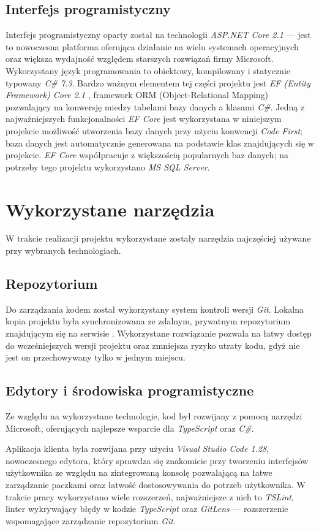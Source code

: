 \documentclass[eng,printmode,openany]{mgr}
\begin{document}
	\subsection{Interfejs programistyczny}
	Interfejs programistyczny oparty został na technologii \textit{ASP.NET Core 2.1} — jest to nowoczesna platforma oferująca działanie na wielu systemach operacyjnych oraz większa wydajność względem starszych rozwiązań firmy Microsoft. Wykorzystany język programowania to obiektowy, kompilowany i statycznie typowany \textit{C\# 7.3}. Bardzo ważnym elementem tej części projektu jest \textit{EF (Entity Framework) Core 2.1} \cite{msdn-efcore}, framework ORM (Object-Relational Mapping) pozwalający na konwersję miedzy tabelami bazy danych a klasami \textit{C\#}. Jedną z najważniejszych funkcjonalności \textit{EF Core} jest wykorzystana w niniejszym projekcie możliwość utworzenia bazy danych przy użyciu konwencji \textit{Code First}; baza danych jest automatycznie generowana na podstawie klas  znajdujących się w projekcie. \textit{EF Core} współpracuje z większością popularnych baz danych; na potrzeby tego projektu wykorzystano \textit{MS SQL Server}.
	
	\section{Wykorzystane narzędzia}
	W trakcie realizacji projektu wykorzystane zostały narzędzia najczęściej używane przy wybranych technologiach.
	\subsection{Repozytorium}
	Do zarządzania kodem został wykorzystany system kontroli wersji \textit{Git}. Lokalna kopia projektu była synchronizowana ze zdalnym, prywatnym repozytorium znajdującym się na serwisie . Wykorzystane rozwiązanie pozwala na łatwy dostęp do wcześniejszych wersji projektu oraz zmniejsza ryzyko utraty kodu, gdyż nie jest on przechowywany tylko w jednym miejscu.
	\subsection{Edytory i środowiska programistyczne}
	Ze względu na wykorzystane technologie, kod był rozwijany z pomocą narzędzi Microsoft, oferujących najlepsze wsparcie dla \textit{TypeScript} oraz \textit{C\#}.
	
	Aplikacja klienta była rozwijana przy użyciu \textit{Visual Studio Code 1.28}, nowoczesnego edytora, który sprawdza się znakomicie przy tworzeniu interfejsów użytkownika ze względu na zintegrowaną konsolę pozwalającą na łatwe zarządzanie paczkami oraz łatwość dostosowywania do potrzeb użytkownika. W trakcie pracy wykorzystano wiele rozszerzeń, najważniejsze z nich to \textit{TSLint}, linter wykrywający błędy w kodzie \textit{TypeScript} oraz \textit{GitLens} — rozszerzenie wspomagające zarządzanie repozytorium \textit{Git}.
	
\end{document}
